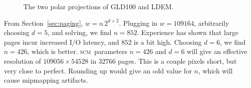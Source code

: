 \documentclass[oneside,10pt]{memoir}
\newcommand{\scm}     {\textsc{scm}}
\begin{document}
\begin{Spacing}{1.1}
\begin{figure}
  \centering
  \caption{The two polar projections of GLD100 and LDEM.}
  \label{fig:gldp}
\end{figure}

From Section~\ref{sec:paging}, $w=n\,2^{d+2}$. Plugging in $w=\num{109164}$, arbitrarily choosing $d=5$, and solving, we find $n=852$. Experience has shown that large pages incur increased I/O latency, and $852$ is a bit high. Choosing $d=6$, we find $n=426$, which is better. \scm\ parameters $n=426$ and $d=6$ will give an effective resolution of $\num{109056}\times\num{54528}$ in $\num{32766}$ pages. This is a couple pixels short, but very close to perfect. Rounding up would give an odd value for $n$, which will cause mipmapping artifacts.


\end{Spacing}
\end{document}
